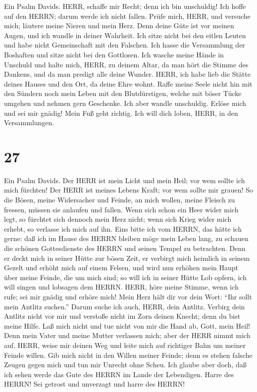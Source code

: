  Ein Psalm Davids. HERR, schaffe mir Recht; denn ich bin
unschuldig! Ich hoffe auf den HERRN; darum werde ich nicht fallen.
 Prüfe mich, HERR, und versuche mich; läutere meine Nieren
und mein Herz.  Denn deine Güte ist vor meinen Augen, und
ich wandle in deiner Wahrheit.  Ich sitze nicht bei den
eitlen Leuten und habe nicht Gemeinschaft mit den Falschen. 
Ich hasse die Versammlung der Boshaften und sitze nicht bei den
Gottlosen.  Ich wasche meine Hände in Unschuld und halte
mich, HERR, zu deinem Altar,  da man hört die Stimme des
Dankens, und da man predigt alle deine Wunder.  HERR, ich
habe lieb die Stätte deines Hauses und den Ort, da deine Ehre wohnt.
 Raffe meine Seele nicht hin mit den Sündern noch mein Leben
mit den Blutdürstigen,  welche mit böser Tücke umgehen und
nehmen gern Geschenke.  Ich aber wandle unschuldig. Erlöse
mich und sei mir gnädig!  Mein Fuß geht richtig. Ich will
dich loben, HERR, in den Versammlungen.

\hypertarget{section-26}{%
\section{27}\label{section-26}}

 Ein Psalm Davids. Der HERR ist mein Licht und mein Heil;
vor wem sollte ich mich fürchten! Der HERR ist meines Lebens Kraft; vor
wem sollte mir grauen!  So die Bösen, meine Widersacher und
Feinde, an mich wollen, meine Fleisch zu fressen, müssen sie anlaufen
und fallen.  Wenn sich schon ein Heer wider mich legt, so
fürchtet sich dennoch mein Herz nicht; wenn sich Krieg wider mich
erhebt, so verlasse ich mich auf ihn.  Eins bitte ich vom
HERRN, das hätte ich gerne: daß ich im Hause des HERRN bleiben möge mein
Leben lang, zu schauen die schönen Gottesdienste des HERRN und seinen
Tempel zu betrachten.  Denn er deckt mich in seiner Hütte
zur bösen Zeit, er verbirgt mich heimlich in seinem Gezelt und erhöht
mich auf einem Felsen,  und wird nun erhöhen mein Haupt über
meine Feinde, die um mich sind; so will ich in seiner Hütte Lob opfern,
ich will singen und lobsagen dem HERRN.  HERR, höre meine
Stimme, wenn ich rufe; sei mir gnädig und erhöre mich!  Mein
Herz hält dir vor dein Wort: ``Ihr sollt mein Antlitz suchen.'' Darum
suche ich auch, HERR, dein Antlitz.  Verbirg dein Antlitz
nicht vor mir und verstoße nicht im Zorn deinen Knecht; denn du bist
meine Hilfe. Laß mich nicht und tue nicht von mir die Hand ab, Gott,
mein Heil!  Denn mein Vater und meine Mutter verlassen
mich; aber der HERR nimmt mich auf.  HERR, weise mir deinen
Weg und leite mich auf richtiger Bahn um meiner Feinde willen.
 Gib mich nicht in den Willen meiner Feinde; denn es stehen
falsche Zeugen gegen mich und tun mir Unrecht ohne Scheu. 
Ich glaube aber doch, daß ich sehen werde das Gute des HERRN im Lande
der Lebendigen.  Harre des HERRN! Sei getrost und unverzagt
und harre des HERRN!


